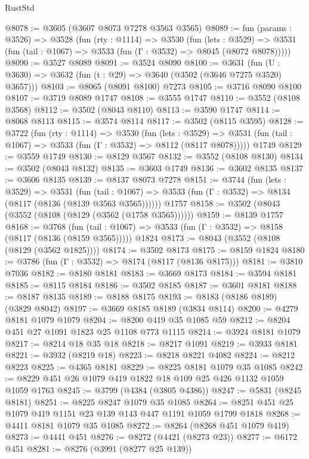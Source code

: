 \begin{lexlean}{RustStd}
\begin{coremodule}
@8078 := @3605 (@3607 @8073 @7278 @3563 @3565)
@8089 := fun (params : @3526) =>
  @3528
    (fun (rty : @1114) =>
    @3530
      (fun (lets : @3529) =>
      @3531 (fun (tail : @1067) => @3533 (fun (Γ : @3532) => @8045 (@8072 @8078)))))
@8090 := @3527 @8089
@8091 := @3524 @8090
@8100 := @3631 (fun (U : @3630) => @3632 (fun (t : @29) => @3640 (@3502 (@3646 @7275 @3520) @3657)))
@8103 := @8065 (@8091 @8100) @7273
@8105 := @3716 @8090 @8100
@8107 := @3719 @8089 @1747
@8108 := @3555 @1747
@8110 := @3552 (@8108 @3568)
@8112 := @3502 (@8043 @8110)
@8113 := @3590 @1747
@8114 := @8068 @8113
@8115 := @3574 @8114
@8117 := @3502 (@8115 @3595)
@8128 := @3722
    (fun (rty : @1114) =>
    @3530
      (fun (lets : @3529) =>
      @3531 (fun (tail : @1067) => @3533 (fun (Γ : @3532) => @8112 (@8117 @8078)))))
    @1749
@8129 := @3559 @1749
@8130 := @8129 @3567
@8132 := @3552 (@8108 @8130)
@8134 := @3502 (@8043 @8132)
@8135 := @3603 @1749
@8136 := @3602 @8135
@8137 := @3606 @8135
@8139 := @8137 @8073 @7278
@8151 := @3744
    (fun (lets : @3529) =>
    @3531
      (fun (tail : @1067) => @3533 (fun (Γ : @3532) => @8134 (@8117 (@8136 (@8139 @3563 @3565))))))
    @1757
@8158 := @3502 (@8043 (@3552 (@8108 (@8129 (@3562 (@1758 @3565))))))
@8159 := @8139 @1757
@8168 := @3768
    (fun (tail : @1067) => @3533 (fun (Γ : @3532) => @8158 (@8117 (@8136 (@8159 @3565)))))
    @1824
@8173 := @8043 (@3552 (@8108 (@8129 (@3562 @1825))))
@8174 := @3502 @8173
@8175 := @8159 @1824
@8180 := @3786 (fun (Γ : @3532) => @8174 (@8117 (@8136 @8175)))
@8181 := @3810 @7036
@8182 := @8180 @8181
@8183 := @3669 @8173
@8184 := @3594 @8181
@8185 := @8115 @8184
@8186 := @3502 @8185
@8187 := @3601 @8181
@8188 := @8187 @8135
@8189 := @8188 @8175
@8193 := @8183 (@8186 @8189) (@3829 @8042)
@8197 := @3669 @8185 @8189 (@3834 @8114)
@8200 := @4279 @8181 @1079 @1079
@8204 := @8200 @419 @35 @1085 @59
@8212 := @8204 @451 @27 @1091 @1823 @25 @1108 @773 @1115
@8214 := @3924 @8181 @1079
@8217 := @8214 @18 @35 @18
@8218 := @8217 @1091
@8219 := @3933 @8181
@8221 := @3932 (@8219 @18)
@8223 := @8218 @8221 @4082
@8224 := @8212 @8223
@8225 := @4365 @8181
@8229 := @8225 @8181 @1079 @35 @1085
@8242 := @8229 @451 @26 @1079 @419 @1822 @18 @109 @25 @426 @1132 @1059 @1059 @1763
@8245 := @3799 (@4384 (@3805 @4386))
@8247 := @5831 (@8245 @8181)
@8251 := @8225 @8247 @1079 @35 @1085
@8264 := @8251 @451 @25 @1079 @419 @1151 @23 @139 @143 @447 @1191 @1059 @1799 @1818
@8268 := @4411 @8181 @1079 @35 @1085
@8272 := @8264 (@8268 @451 @1079 @419)
@8273 := @4441 @451
@8276 := @8272 (@4421 (@8273 @23))
@8277 := @6172 @451
@8281 := @8276 (@3991 (@8277 @25 @139))

\end{coremodule}
\end{lexlean}
